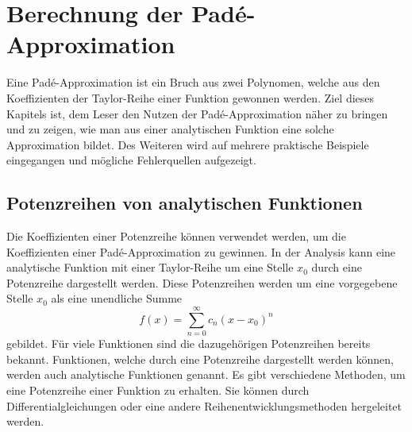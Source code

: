 %
%
%

\section{Berechnung der Padé-Approximation
\label{pade:section:Problemstellung}}
Eine Padé-Approximation ist ein Bruch aus zwei Polynomen, welche aus den Koeffizienten der Taylor-Reihe einer Funktion gewonnen werden. 
Ziel dieses Kapitels ist, dem Leser den Nutzen der Padé-Approximation näher zu bringen und zu zeigen, wie man aus einer analytischen Funktion eine solche Approximation bildet.
Des Weiteren wird auf mehrere praktische Beispiele eingegangen und mögliche Fehlerquellen aufgezeigt. 



\subsection{Potenzreihen von analytischen Funktionen
\label{pade:subsection:Potenzreihen}}
Die Koeffizienten einer Potenzreihe können verwendet werden, um die Koeffizienten einer Padé-Approximation zu gewinnen. 
In der Analysis kann eine analytische Funktion mit einer Taylor-Reihe um eine Stelle $x_{0}$ durch eine Potenzreihe dargestellt werden. 
Diese Potenzreihen werden um eine vorgegebene Stelle $x_{0}$ als eine unendliche Summe 
\begin{equation}
f(x)=\sum_{n=0}^{\infty} c_{n} (x-x_{0})^{n} 
\label{pade:expofunk}
\end{equation}
gebildet.
Für viele Funktionen sind die dazugehörigen Potenzreihen bereits bekannt. 
Funktionen, welche durch eine Potenzreihe dargestellt werden können, werden auch analytische Funktionen genannt.
Es gibt verschiedene Methoden, um eine Potenzreihe einer Funktion zu erhalten. 
Sie können durch Differentialgleichungen oder eine andere Reihenentwicklungsmethoden hergeleitet werden.
%

